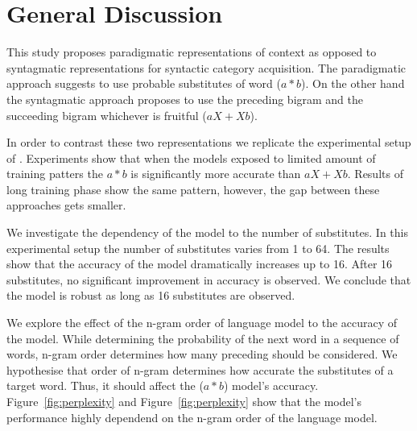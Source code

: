 \section{General Discussion}

This study proposes paradigmatic representations of context as opposed to
syntagmatic representations for syntactic category acquisition. The
paradigmatic approach suggests to use probable substitutes of word ($a*b$). On
the other hand the syntagmatic approach proposes to use the preceding bigram
and the succeeding bigram whichever is fruitful ($aX + Xb$).

In order to contrast these two representations we replicate the experimental
setup of \cite{clair2010}. Experiments show that when the models exposed to
limited amount of training patters the $a*b$ is significantly more accurate
than $aX + Xb$. Results of long training phase show the same pattern, however,
the gap between these approaches gets smaller.

We investigate the dependency of the model to the number of substitutes. In
this experimental setup the number of substitutes varies from 1 to 64. The
results show that the accuracy of the model dramatically increases up to 16.
After 16 substitutes, no significant improvement in accuracy is observed. We
conclude that the model is robust as long as 16 substitutes are observed.

We explore the effect of the n-gram order of language model to the accuracy of
the model. While determining the probability of the next word in a sequence of
words, n-gram order determines how many preceding should be considered.  We
hypothesise that order of n-gram determines how accurate the substitutes of a
target word. Thus, it should affect the ($a*b$) model's accuracy.
Figure~\ref{fig:perplexity} and Figure~\ref{fig:perplexity} show that the
model's performance highly dependend on the n-gram order of the language model.
